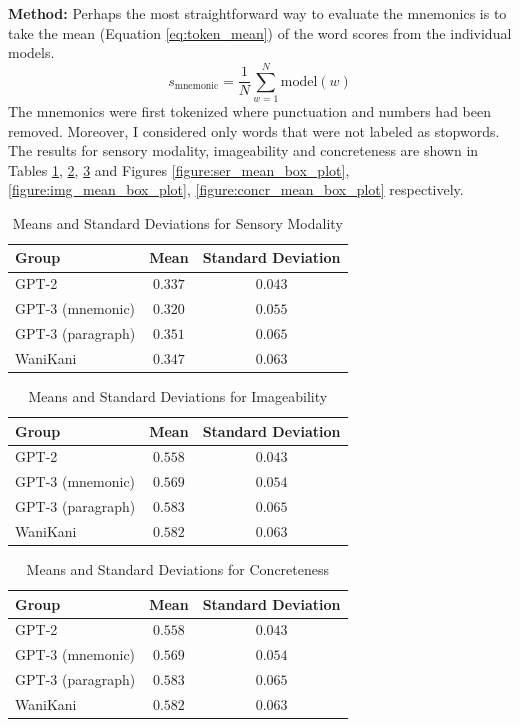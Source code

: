 \textbf{Method:} Perhaps the most straightforward way to evaluate the mnemonics is to take the mean (Equation \ref{eq:token_mean}) of the word scores from the individual models.
\begin{equation} \label{eq:token_mean}
    s_{\text{mnemonic}} = \frac{1}{N}\sum_{w=1}^{N}\text{model}(w)
\end{equation}
The mnemonics were first tokenized where punctuation and numbers had been removed. Moreover, I considered only words that were not labeled as stopwords. The results for sensory modality, imageability and concreteness are shown in Tables \ref{tab:mean_std_ser}, \ref{tab:mean_std_img}, \ref{tab:mean_std_concr} and Figures \ref{figure:ser_mean_box_plot}, \ref{figure:img_mean_box_plot}, \ref{figure:concr_mean_box_plot} respectively.
\begin{table}[ht] 
\centering
\caption{Means and Standard Deviations for Sensory Modality}
\label{table:group_stats}
\begin{tabular}{lcc}
\toprule
Group & Mean & Standard Deviation \\
\midrule
GPT-2& $0.337$ & $0.043$ \\
GPT-3 (mnemonic) & $0.320$ & $0.055$ \\
GPT-3 (paragraph)& $0.351$ & $0.065$ \\
WaniKani & $0.347$ & $0.063$ \\
\bottomrule
\end{tabular}
\label{tab:mean_std_ser}
\end{table}

\begin{table}[ht] 
\centering
\caption{Means and Standard Deviations for Imageability}
\label{table:group_stats}
\begin{tabular}{lcc}
\toprule
Group & Mean & Standard Deviation \\
\midrule
GPT-2& $0.558$ & $0.043$ \\
GPT-3 (mnemonic) & $0.569$ & $0.054$ \\
GPT-3 (paragraph)& $0.583$ & $0.065$ \\
WaniKani & $0.582$ & $0.063$ \\
\bottomrule
\end{tabular}
\label{tab:mean_std_img}
\end{table}

\begin{table}[ht] 
\centering
\caption{Means and Standard Deviations for Concreteness}
\label{table:group_stats}
\begin{tabular}{lcc}
\toprule
Group & Mean & Standard Deviation \\
\midrule
GPT-2& $0.558$ & $0.043$ \\
GPT-3 (mnemonic) & $0.569$ & $0.054$ \\
GPT-3 (paragraph)& $0.583$ & $0.065$ \\
WaniKani & $0.582$ & $0.063$ \\
\bottomrule
\end{tabular}
\label{tab:mean_std_concr}
\end{table}

